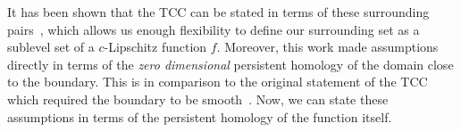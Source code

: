 It has been shown that the TCC can be stated in terms of these surrounding pairs~\cite{cavanna2017when}, which allows us enough flexibility to define our surrounding set as a sublevel set of a $c$-Lipschitz function $f$.
Moreover, this work made assumptions directly in terms of the \emph{zero dimensional} persistent homology of the domain close to the boundary.
This is in comparison to the original statement of the TCC which required the boundary to be smooth~\cite{desilva07coverage}.
Now, we can state these assumptions in terms of the persistent homology of the function itself.
%

